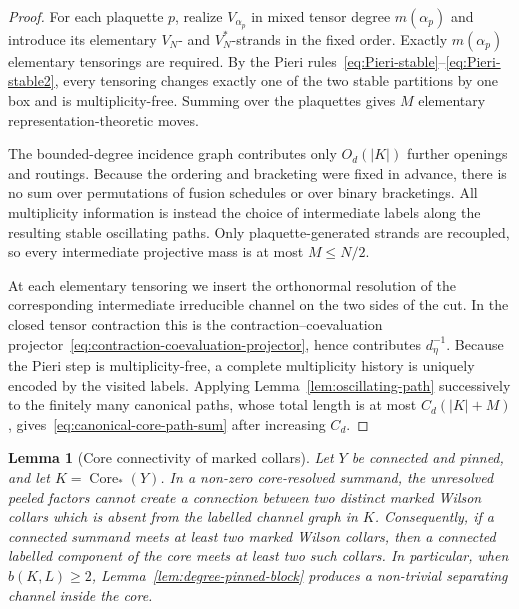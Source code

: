 \documentclass[11pt,a4paper,reqno]{amsart}
\newtheorem{lemma}[theorem]{Lemma}
\theoremstyle{definition}
\theoremstyle{remark}
\begin{document}
\begin{proof}
For each plaquette $p$, realize $V_{\alpha_p}$ in mixed tensor degree $m(\alpha_p)$ and introduce its elementary $V_N$- and $V_N^*$-strands in the fixed order.  Exactly $m(\alpha_p)$ elementary tensorings are required.  By the Pieri rules~\eqref{eq:Pieri-stable}--\eqref{eq:Pieri-stable2}, every tensoring changes exactly one of the two stable partitions by one box and is multiplicity-free.  Summing over the plaquettes gives $M$ elementary representation-theoretic moves.

The bounded-degree incidence graph contributes only $O_d(|K|)$ further openings and routings.  Because the ordering and bracketing were fixed in advance, there is no sum over permutations of fusion schedules or over binary bracketings.  All multiplicity information is instead the choice of intermediate labels along the resulting stable oscillating paths.  Only plaquette-generated strands are recoupled, so every intermediate projective mass is at most $M\le N/2$.

At each elementary tensoring we insert the orthonormal resolution of the corresponding intermediate irreducible channel on the two sides of the cut.  In the closed tensor contraction this is the contraction--coevaluation projector~\eqref{eq:contraction-coevaluation-projector}, hence contributes $d_{\eta}^{-1}$.  Because the Pieri step is multiplicity-free, a complete multiplicity history is uniquely encoded by the visited labels.  Applying Lemma~\ref{lem:oscillating-path} successively to the finitely many canonical paths, whose total length is at most $C_d(|K|+M)$, gives~\eqref{eq:canonical-core-path-sum} after increasing $C_d$.
\end{proof}

\begin{lemma}[Core connectivity of marked collars]\label{lem:core-collar-connectivity}
Let $Y$ be connected and pinned, and let $K=\operatorname{Core}_*(Y)$. In a non-zero core-resolved summand, the unresolved peeled factors cannot create a connection between two distinct marked Wilson collars which is absent from the labelled channel graph in $K$. Consequently, if a connected summand meets at least two marked Wilson collars, then a connected labelled component of the core meets at least two such collars. In particular, when $b(K,L)\ge2$, Lemma~\ref{lem:degree-pinned-block} produces a non-trivial separating channel inside the core.
\end{lemma}
\end{document}
